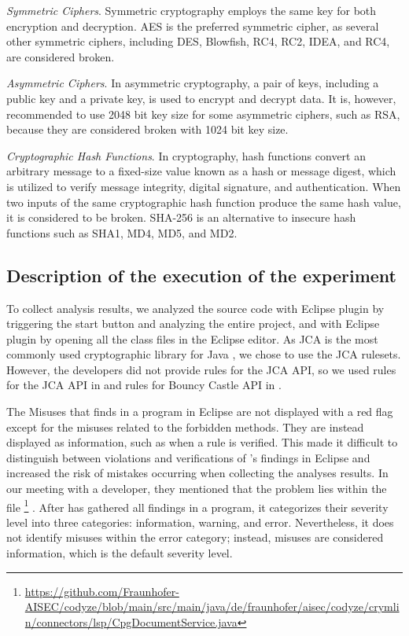 \emph{Symmetric Ciphers}. Symmetric cryptography employs the same key for both encryption and decryption. AES is the preferred symmetric cipher, as several other symmetric ciphers, including DES, Blowfish, RC4, RC2, IDEA, and RC4, are considered broken.

\emph{Asymmetric Ciphers}. In asymmetric cryptography, a pair of keys, including a public key and a private key, is used to encrypt and decrypt data. It is, however, recommended to use 2048 bit key size for some asymmetric ciphers, such as RSA, because they are considered broken with 1024 bit key size.

\emph{Cryptographic Hash Functions}. In cryptography, hash functions convert an arbitrary message to a fixed-size value known as a hash or message digest, which is utilized to verify message integrity, digital signature, and authentication. When two inputs of the same cryptographic hash function produce the same hash value, it is considered to be broken. SHA-256 is an alternative to insecure hash functions such as SHA1, MD4, MD5, and MD2.


\subsection{Description of the execution of the experiment}

To collect analysis results, we analyzed the \cryptoapibench{} source code with \cognicryptsast{} Eclipse plugin by triggering the start button and analyzing the entire project, and with \codyze{} Eclipse plugin by opening all the class files in the Eclipse editor. As JCA is the most commonly used cryptographic library for Java \cite{snb16}, we chose to use the JCA rulesets. However, the \MARK{} developers did not provide rules for the JCA API, so we used \crysl{} rules for the JCA API \cite{apirules} in \cogcnicryptsast{} and \MARK{} rules for Bouncy Castle API \cite{codyzegit} in \codyze.

The Misuses that \codyze{} finds in a program in Eclipse are not displayed with a red flag except for the misuses related to the forbidden methods. They are instead displayed as information, such as when a \MARK{} rule is verified. This made it difficult to distinguish between violations and verifications of \codyze's findings in Eclipse and increased the risk of mistakes occurring when collecting the analyses results. In our meeting with a \codyze{} developer, they mentioned that the problem lies within the file \footnote{\url{https://github.com/Fraunhofer-AISEC/codyze/blob/main/src/main/java/de/fraunhofer/aisec/codyze/crymlin/connectors/lsp/CpgDocumentService.java}} . After \codyze{} has gathered all findings in a program, it categorizes their severity level into three categories: information, warning, and error. Nevertheless, it does not identify misuses within the error category; instead, misuses are considered information, which is the default severity level.

